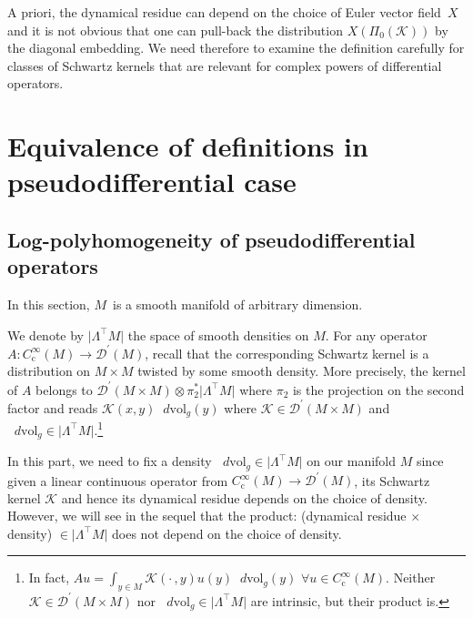 \documentclass[10pt]{amsart}
\let\pazocal\mathscr
\newcommand{\LtM}{\Lambda^{\!\!\top\!}M}
\theoremstyle{definition}
\newcommand\cD{{\pazocal D}}
\renewcommand\c{\mathrm{c}}
\let\euler X
\newcommand\dvol{\mathop{}\!d\mathrm{vol}}
\begin{document}
A priori, the dynamical residue can depend on the choice of Euler vector field~$\euler$ and it is not obvious that one can pull-back the distribution $\euler (\Pi_0(\pazocal{K}))$ by the diagonal embedding. We need therefore to examine the definition carefully for classes of Schwartz kernels that are relevant for complex powers of differential operators.

\section{Equivalence of definitions in pseudodifferential case}\label{ss:wodzickipdo}

\subsection{Log-polyhomogeneity of pseudodifferential operators}

In this section, $M$~is a smooth manifold of arbitrary dimension.

We denote by $\vert \LtM \vert$ the space of smooth densities
on $M$. For any operator \hbox{$A:C^\infty_\c(M)\to \cD^\prime(M)$}, recall that the corresponding Schwartz kernel is a distribution on $M\times M$ twisted by some smooth density. More precisely, the kernel of $A$ belongs to $\cD^\prime(M\times M)\otimes \pi_2^*\vert \LtM \vert$ where $\pi_2$ is the projection
on the second factor and reads $\pazocal{K}(x,y)\dvol_g(y)$ where $\pazocal{K}\in \cD^\prime(M\times M)$ and $\dvol_g\in \vert \LtM \vert$.\footnote{In fact, $Au=\int_{y\in M} \pazocal{K}(\cdot\,,y)u(y)\dvol_g(y)$ $\forall u\in C^\infty_\c(M)$. Neither $\pazocal{K}\in \cD^\prime(M\times M)$ nor $\dvol_g\in \vert \LtM \vert$ are intrinsic, but their product is.}

In this part, we need to fix a density $\dvol_g\in \vert \LtM \vert$ on our manifold $M$ since given a linear continuous operator from $C^\infty_\c(M)\to \pazocal{D}^\prime(M)$, its Schwartz kernel $ \pazocal{K}$ and hence its dynamical residue depends on the choice of density. However, we will see in the sequel that the product: (dynamical residue $\times$ density) $\in \vert \LtM \vert$ does not depend on the choice of density.
\end{document}
